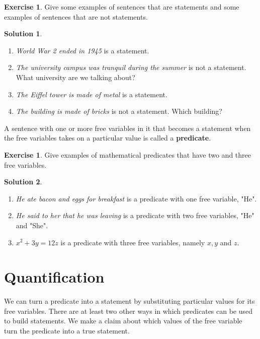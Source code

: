 \documentclass[a4paper, 11pt]{report}
\theoremstyle{plain}
\theoremstyle{definition}
\newtheorem{exrc}[thm]{Exercise}
\newtheorem*{sltn}{Solution}
\begin{document}
\begin{exrc}
  Give some examples of sentences that are statements and some examples of sentences that are not statements.
\end{exrc}

\begin{sltn}
\begin{enumerate}
  \item \textit{World War 2 ended in 1945} is a statement.
  \item \textit{The university campus was tranquil during the summer} is not a statement. What university are we talking about?
  \item \textit{The Eiffel tower is made of metal} is a statement.
  \item \textit{The building is made of bricks} is not a statement. Which building?
\end{enumerate}
\end{sltn}

A sentence with one or more free variables in it that becomes a statement
when the free variables takes on a particular value is called a
\textbf{predicate}.

\begin{exrc}
  Give examples of mathematical predicates that have two and three free variables.
\end{exrc}

\begin{sltn}
\begin{enumerate}
  \item \textit{He ate bacon and eggs for breakfast} is a predicate with one free variable, "He".
  \item \textit{He said to her that he was leaving} is a predicate with two free variables, "He" and "She".
  \item $x ^ 2 + 3y = 12z$ is a predicate with three free variables, namely $x, y$ and $z$.
\end{enumerate}
\end{sltn}

\section{Quantification}

We can turn a predicate into a statement by substituting particular values
for its free variables. There are at least two other ways in  which
predicates can be used to build statements. We make a claim about which
values of the free variable turn the predicate into a true statement.
\end{document}
